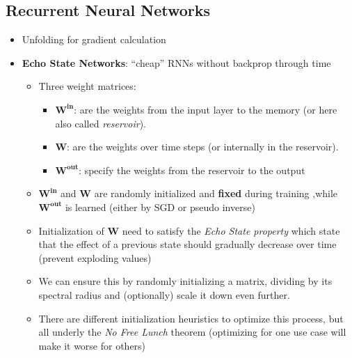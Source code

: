 \subsection{Recurrent Neural Networks}
\begin{itemize}
	\item Unfolding for gradient calculation
	\item \textbf{Echo State Networks}: ``cheap'' RNNs without backprop through time
	\begin{itemize}
		\item Three weight matrices:
		\begin{itemize}
			\item $\bm{W}^{\textbf{in}}$: are the weights from the input layer to the memory (or here also called \textit{reservoir}). 
			\item $\bm{W}$: are the weights over time steps (or internally in the reservoir).
			\item $\bm{W}^{\textbf{out}}$: specify the weights from the reservoir to the output
		\end{itemize}
		\item $\bm{W}^{\textbf{in}}$ and $\bm{W}$ are randomly initialized and \textbf{fixed} during training ,while $\bm{W}^{\textbf{out}}$ is learned (either by SGD or pseudo inverse)
		\item Initialization of $\bm{W}$ need to satisfy the \textit{Echo State property} which state that the effect of a previous state should gradually decrease over time (prevent exploding values)
		\item We can ensure this by randomly initializing a matrix, dividing by its spectral radius and (optionally) scale it down even further.
		\item There are different initialization heuristics to optimize this process, but all underly the \textit{No Free Lunch} theorem (optimizing for one use case will make it worse for others)
	\end{itemize}
\end{itemize}

